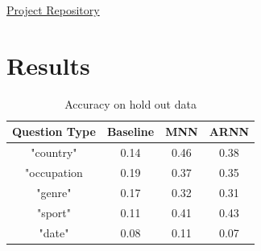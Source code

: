 \documentclass{article}
\begin{document}
\href{https://github.com/Ashwinasokan/LatentlyDeepLearningCertificate/tree/master/SukhbaatarSzlamWestonEtAl2015}{Project Repository}

\section*{Results}

\begin{table}[h!]
\centering
\begin{tabular}{ |c|c|c|c| }
\hline
Question Type & Baseline & MNN & ARNN \\
\hline 
 "country" & 0.14 & 0.46 & 0.38 \\ 
 \hline
 "occupation & 0.19 & 0.37 & 0.35\\  
 \hline
 "genre" & 0.17 & 0.32 & 0.31 \\
 \hline
 "sport" & 0.11 & 0.41 & 0.43\\
 \hline
 "date" & 0.08 & 0.11 & 0.07\\
 \hline
\end{tabular}
\caption{Accuracy on hold out data}
\end{table}
\end{document}
